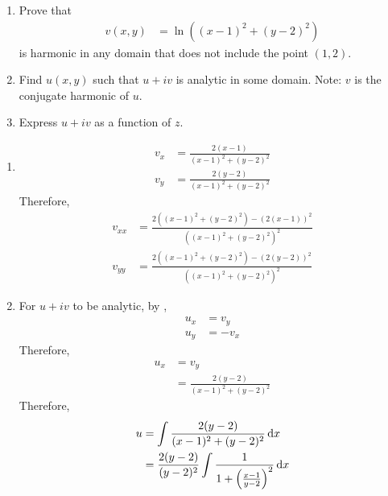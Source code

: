 \documentclass[titlepage, fleqn, a4paper, 12pt, twoside]{article}
\theoremstyle{definition}
\theoremstyle{theorem}
\begin{document}
\begin{question}
	\begin{enumerate}
		\item
			Prove that
			\begin{align*}
				v(x,y) & = \ln\left( (x - 1)^2 + (y - 2)^2 \right)
			\end{align*}
			is harmonic in any domain that does not include the point $(1,2)$.
		\item
			Find $u(x,y)$ such that $u + i v$ is analytic in some domain.
			Note: $v$ is the conjugate harmonic of $u$.
		\item
			Express $u + i v$ as a function of $z$.
	\end{enumerate}
\end{question}

\begin{solution}
	\begin{enumerate}[leftmargin=*]
		\item
			\begin{align*}
				v_x & = \frac{2 (x - 1)}{(x - 1)^2 + (y - 2)^2} \\
				v_y & = \frac{2 (y - 2)}{(x - 1)^2 + (y - 2)^2}
			\end{align*}
			Therefore,
			\begin{align*}
				v_{x x} & = \frac{2 \left( (x - 1)^2 + (y - 2)^2 \right) - \left( 2 (x - 1) \right)^2}{\left( (x - 1)^2 + (y - 2)^2 \right)^2} \\
				v_{y y} & = \frac{2 \left( (x - 1)^2 + (y - 2)^2 \right) - \left( 2 (y - 2) \right)^2}{\left( (x - 1)^2 + (y - 2)^2 \right)^2}
			\end{align*}
		\item
			For $u + i v$ to be analytic, by ,
			\begin{align*}
				u_x & = v_y \\
				u_y & = -v_x
			\end{align*}
			Therefore,
			\begin{align*}
				u_x & = v_y \\
                                    & = \frac{2 (y - 2)}{(x - 1)^2 + (y - 2)^2}
			\end{align*}
			Therefore,
			\begin{align*}
				u & = \int \frac{2 (y - 2)}{(x - 1)^2 + (y - 2)^2} \dif x                                        \\
                                  & = \frac{2 (y - 2)}{(y - 2)^2} \int \frac{1}{1 + \left( \frac{x - 1}{y - 2} \right)^2} \dif x \\ \

\end{align*}
\end{enumerate}
\end{solution}
\end{document}
